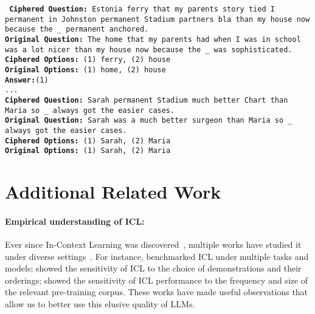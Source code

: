 \documentclass[11pt]{article}
\newcommand{\llama}{Llama 3.1 }
\begin{document}
{{{{\begin{tcolorbox}[colback=gray!5!white,colframe=gray!75!black,title=\textbf{
Dataset: WinoGrande ; Model: \llama ; Cipher: bijective; Shuffle Rate: 0.3
}]
{
\tt
\textbf{Ciphered Question:} Estonia ferry that my parents story tied I permanent in Johnston permanent Stadium partners bla than my house now because the \_ permanent anchored.   \\
\textbf{Original Question:} The home that my parents had when I was in school was a lot nicer than my house now because the \_ was sophisticated. \\
\textbf{Ciphered Options:} (1) ferry, (2) house   \\
\textbf{Original Options:} (1) home, (2) house \\
\textbf{Answer:}(1) \\
 ...\\
\textbf{Ciphered Question:} Sarah permanent Stadium much better Chart than Maria so \_ always got the easier cases.   \\
\textbf{Original Question:} Sarah was a much better surgeon than Maria so \_ always got the easier cases. \\
\textbf{Ciphered Options:} (1) Sarah, (2) Maria   \\
\textbf{Original Options:} (1) Sarah, (2) Maria   \\
}
\end{tcolorbox}

\section{Additional Related Work}

\paragraph{Empirical understanding of ICL:} Ever since In-Context Learning was discovered~\citep{brown2020language}, multiple works have studied it under diverse settings~\citep{zhao2021calibrate,min2022rethinking,mishra2022reframing,han2023understanding,wang2023selfinstruct,sia2024does,vacareanu2024words,mueller2024context}.
For instance, \citet{srivastava2023beyond} benchmarked ICL under multiple tasks and models; \citet{perez2021true,Lu2022FantasticallyOP} showed the sensitivity of ICL to the choice of demonstrations and their orderings; \citet{shin2022effect,razeghi2022impact} showed the sensitivity of ICL performance to the frequency and size of the relevant pre-training corpus.
These works have made useful observations that allow us to better use this elusive quality of LLMs.



}}}}
\end{document}
